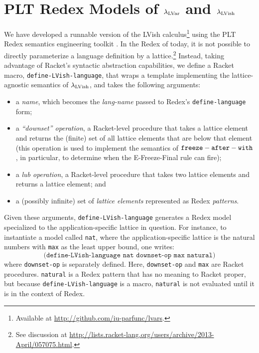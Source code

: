 \chapter{PLT Redex Models of $\lambda_{\textrm{LVar}}$ and $\lambda_{\textrm{LVish}}$}\label{app:plt-redex}


We have developed a runnable version of the LVish
calculus\footnote{Available at
  \url{http://github.com/iu-parfunc/lvars}.} using the PLT Redex
semantics engineering toolkit \cite{redex-book}.  In the Redex of
today, it is not possible to directly parameterize a language
definition by a lattice.\footnote{See discussion at
  \url{http://lists.racket-lang.org/users/archive/2013-April/057075.html}.}
Instead, taking advantage of Racket's syntactic abstraction
capabilities, we define a Racket macro,
\texttt{define-LVish-language}, that wraps a template implementing the
lattice-agnostic semantics of $\lambda_{\textrm{LVish}}$, and
takes the following arguments:
\begin{itemize}
\item a \emph{name}, which becomes the \emph{lang-name} passed to
  Redex's \texttt{define-language} form;
\item a \emph{``downset'' operation}, a Racket-level procedure that
  takes a lattice element and returns the (finite) set of all lattice
  elements that are below that element (this operation is used to
  implement the semantics of ${\mbox{\texttt{freeze}}-\mbox{\texttt{after}}-\mbox{\texttt{with}}}$, in particular, to determine when
  the {\sc E-Freeze-Final} rule can fire);
\item a \emph{lub operation}, a Racket-level procedure that takes two
  lattice elements and returns a lattice element; and
\item a (possibly infinite) set of \emph{lattice elements} represented
  as Redex \emph{patterns}.
\end{itemize}
Given these arguments, \texttt{define-LVish-language} generates a
Redex model specialized to the application-specific lattice in
question. For instance, to instantiate a model called \texttt{nat},
where the application-specific lattice is the natural numbers with
\texttt{max} as the least upper bound, one writes:
\[
\texttt{(define-LVish-language nat downset-op max natural)}
\]
where \texttt{downset-op} is separately defined.  Here,
\texttt{downset-op} and \texttt{max} are Racket procedures.
\texttt{natural} is a Redex pattern that has no meaning to Racket
proper, but because \texttt{define-LVish-language} is a macro,
\texttt{natural} is not evaluated until it is in the context of
Redex.





